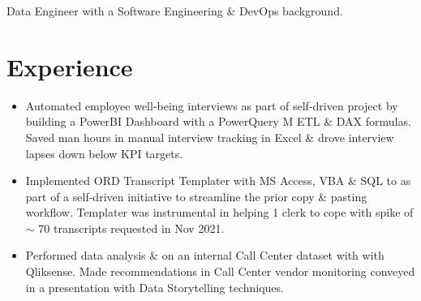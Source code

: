 %
%


\fancyhead{} %


Data Engineer with a Software Engineering \& DevOps background.

\section{Experience}
\begin{itemize}
  \item Automated employee well-being interviews as part of self-driven project by
    building a PowerBI Dashboard with a PowerQuery M ETL \& DAX formulas. Saved man hours
    in manual interview tracking in Excel \& drove interview lapses down below KPI targets.

  \item Implemented ORD Transcript Templater with MS Access, VBA \& SQL to as part
    of a self-driven initiative to streamline the prior copy \& pasting workflow.
    Templater was instrumental in helping 1 clerk to cope with spike of $\sim$ 
    70 transcripts requested in Nov 2021.

  \item Performed data analysis \& on an internal Call Center dataset with
    with Qliksense. Made recommendations in Call Center vendor monitoring 
    conveyed in a presentation with Data Storytelling techniques.
\end{itemize}

